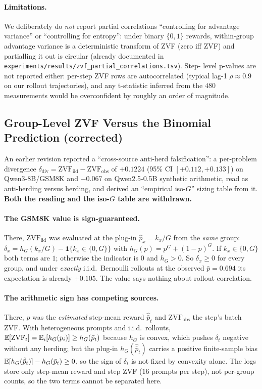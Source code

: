 \paragraph{Limitations.}
We deliberately do \emph{not} report partial correlations
``controlling for advantage variance'' or ``controlling for
entropy'': under binary $\{0,1\}$ rewards, within-group advantage
variance is a deterministic transform of ZVF (zero iff ZVF) and
partialling it out is circular (already documented in
\texttt{experiments/results/zvf\_partial\_correlations.tsv}). Step-
level p-values are not reported either: per-step ZVF rows are
autocorrelated (typical lag-1 $\rho \approx 0.9$ on our rollout
trajectories), and any t-statistic inferred from the $480$
measurements would be overconfident by roughly an order of
magnitude.

\subsection{Group-Level ZVF Versus the Binomial Prediction (corrected)}
\label{sec:zvf-cross-source-falsification}

An earlier revision reported a ``cross-source anti-herd falsification'':
a per-problem divergence
$\delta_{\mathrm{div}}=\mathrm{ZVF}_{\mathrm{iid}}-\mathrm{ZVF}_{\mathrm{obs}}$
of $+0.1224$ (95\% CI $[+0.112,+0.133]$) on Qwen3-8B/GSM8K and $-0.067$ on
Qwen2.5-0.5B synthetic arithmetic, read as anti-herding versus herding, and
derived an ``empirical iso-$G$'' sizing table from it. \textbf{Both the
reading and the iso-$G$ table are withdrawn.}

\paragraph{The GSM8K value is sign-guaranteed.} There, $\mathrm{ZVF}_{\mathrm{iid}}$
was evaluated at the plug-in $\hat p_x=k_x/G$ from the \emph{same} group:
$\delta_x=h_G(k_x/G)-\mathbf{1}\{k_x\in\{0,G\}\}$ with
$h_G(p)=p^G+(1-p)^G$. If $k_x\in\{0,G\}$ both terms are $1$; otherwise the
indicator is $0$ and $h_G>0$. So $\delta_x\ge0$ for every group, and under
\emph{exactly} i.i.d.\ Bernoulli rollouts at the observed $\bar p=0.694$ its
expectation is already $+0.105$. The value says nothing about rollout
correlation.

\paragraph{The arithmetic sign has competing sources.} There, $p$ was the
\emph{estimated} step-mean reward $\hat{\bar p}_t$ and $\mathrm{ZVF}_{\mathrm{obs}}$
the step's batch ZVF. With heterogeneous prompts and i.i.d.\ rollouts,
$\mathbb{E}[\mathrm{ZVF}_t]=\mathbb{E}_i[h_G(p_i)]\ge h_G(\bar p_t)$ because $h_G$ is convex, which
pushes $\delta_t$ negative without any herding; but the plug-in
$h_G(\hat{\bar p}_t)$ carries a positive finite-sample bias
$\mathbb{E}[h_G(\hat{\bar p}_t)]-h_G(\bar p_t)\ge0$, so the sign of $\delta_t$ is not
fixed by convexity alone. The logs store only step-mean reward and step ZVF
($16$ prompts per step), not per-group counts, so the two terms cannot be
separated here.

